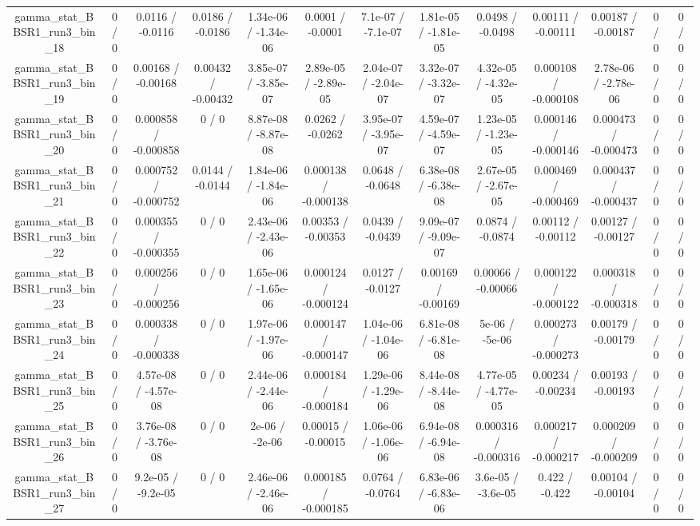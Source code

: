 \documentclass[10pt]{article}
\begin{document}
\begin{table}[htbp]
\begin{center}
\begin{tabular}{|c|c|c|c|c|c|c|c|c|c|c|c|c|}
  gamma_stat_BBSR1_run3_bin_18 & 0 / 0 & 0.0116 / -0.0116 & 0.0186 / -0.0186 & 1.34e-06 / -1.34e-06 & 0.0001 / -0.0001 & 7.1e-07 / -7.1e-07 & 1.81e-05 / -1.81e-05 & 0.0498 / -0.0498 & 0.00111 / -0.00111 & 0.00187 / -0.00187 & 0 / 0 & 0 / 0 \\ 
  gamma_stat_BBSR1_run3_bin_19 & 0 / 0 & 0.00168 / -0.00168 & 0.00432 / -0.00432 & 3.85e-07 / -3.85e-07 & 2.89e-05 / -2.89e-05 & 2.04e-07 / -2.04e-07 & 3.32e-07 / -3.32e-07 & 4.32e-05 / -4.32e-05 & 0.000108 / -0.000108 & 2.78e-06 / -2.78e-06 & 0 / 0 & 0 / 0 \\ 
  gamma_stat_BBSR1_run3_bin_20 & 0 / 0 & 0.000858 / -0.000858 & 0 / 0 & 8.87e-08 / -8.87e-08 & 0.0262 / -0.0262 & 3.95e-07 / -3.95e-07 & 4.59e-07 / -4.59e-07 & 1.23e-05 / -1.23e-05 & 0.000146 / -0.000146 & 0.000473 / -0.000473 & 0 / 0 & 0 / 0 \\ 
  gamma_stat_BBSR1_run3_bin_21 & 0 / 0 & 0.000752 / -0.000752 & 0.0144 / -0.0144 & 1.84e-06 / -1.84e-06 & 0.000138 / -0.000138 & 0.0648 / -0.0648 & 6.38e-08 / -6.38e-08 & 2.67e-05 / -2.67e-05 & 0.000469 / -0.000469 & 0.000437 / -0.000437 & 0 / 0 & 0 / 0 \\ 
  gamma_stat_BBSR1_run3_bin_22 & 0 / 0 & 0.000355 / -0.000355 & 0 / 0 & 2.43e-06 / -2.43e-06 & 0.00353 / -0.00353 & 0.0439 / -0.0439 & 9.09e-07 / -9.09e-07 & 0.0874 / -0.0874 & 0.00112 / -0.00112 & 0.00127 / -0.00127 & 0 / 0 & 0 / 0 \\ 
  gamma_stat_BBSR1_run3_bin_23 & 0 / 0 & 0.000256 / -0.000256 & 0 / 0 & 1.65e-06 / -1.65e-06 & 0.000124 / -0.000124 & 0.0127 / -0.0127 & 0.00169 / -0.00169 & 0.00066 / -0.00066 & 0.000122 / -0.000122 & 0.000318 / -0.000318 & 0 / 0 & 0 / 0 \\ 
  gamma_stat_BBSR1_run3_bin_24 & 0 / 0 & 0.000338 / -0.000338 & 0 / 0 & 1.97e-06 / -1.97e-06 & 0.000147 / -0.000147 & 1.04e-06 / -1.04e-06 & 6.81e-08 / -6.81e-08 & 5e-06 / -5e-06 & 0.000273 / -0.000273 & 0.00179 / -0.00179 & 0 / 0 & 0 / 0 \\ 
  gamma_stat_BBSR1_run3_bin_25 & 0 / 0 & 4.57e-08 / -4.57e-08 & 0 / 0 & 2.44e-06 / -2.44e-06 & 0.000184 / -0.000184 & 1.29e-06 / -1.29e-06 & 8.44e-08 / -8.44e-08 & 4.77e-05 / -4.77e-05 & 0.00234 / -0.00234 & 0.00193 / -0.00193 & 0 / 0 & 0 / 0 \\ 
  gamma_stat_BBSR1_run3_bin_26 & 0 / 0 & 3.76e-08 / -3.76e-08 & 0 / 0 & 2e-06 / -2e-06 & 0.00015 / -0.00015 & 1.06e-06 / -1.06e-06 & 6.94e-08 / -6.94e-08 & 0.000316 / -0.000316 & 0.000217 / -0.000217 & 0.000209 / -0.000209 & 0 / 0 & 0 / 0 \\ 
  gamma_stat_BBSR1_run3_bin_27 & 0 / 0 & 9.2e-05 / -9.2e-05 & 0 / 0 & 2.46e-06 / -2.46e-06 & 0.000185 / -0.000185 & 0.0764 / -0.0764 & 6.83e-06 / -6.83e-06 & 3.6e-05 / -3.6e-05 & 0.422 / -0.422 & 0.00104 / -0.00104 & 0 / 0 & 0 / 0 \\ 

\end{tabular}
\end{center}
\end{table}
\end{document}

